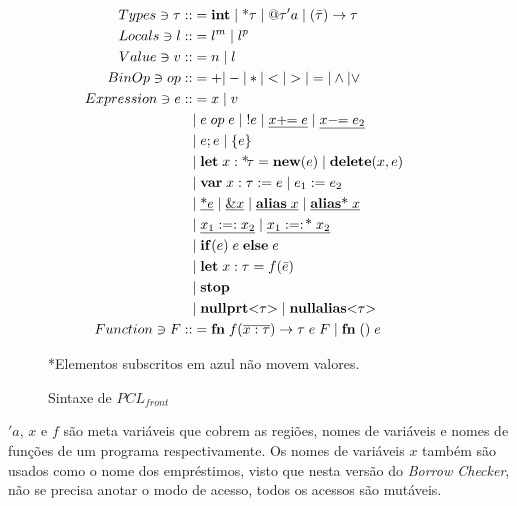 \def\notmov#1{\color{blue}\underline{{\color{black}#1}}\color{black}}

\begin{figure}[ht]
	\caption{Sintaxe de $PCL_{front}$}
	\label{fig:pcl-front:sintax}
	\begin{align*}
		Types \ni \tau ::&= \KW{int} \OR \text{*}\tau \OR @\tau'a \OR (\bar\tau) \to \tau \\
		Locals \ni l ::&= l^m \OR l^p &&\\ 
		Value \ni v ::&= n \OR l && \\
		BinOp \ni op ::&= + | - | * | < | > | = | \land | \lor \\
		Expression \ni e ::&= x \OR v \\
		&\NLOR e\; op\; e \OR !e \OR \notmov{x +\!\!= e} \OR \notmov{x -\!\!= e_2}\\
		&\NLOR e;e \OR \{e\} \\ 
		&\NLOR \KW{let}\;x:\text{*}\!\tau = \KW{new}(e) \OR \KW{delete}(x, e) \; \\ 
		&\NLOR \KW{var}\; x: \tau := e \OR e_1 := e_2 \\
		&\NLOR \notmov{\text{*}e} \OR \notmov{\&x} \OR \notmov{\KW{alias} \; x} \OR \notmov{\KW{alias}\text{*} \; x}\\
		&\NLOR \notmov{x_1 :=: x_2} \OR \notmov{x_1 :=:\!\text{*}\;x_2}\\
		&\NLOR \KW{if}(e) \; e \; \KW{else} \; e\\
		&\NLOR \KW{let}\;x:\tau = f(\bar e) \\ 
		&\NLOR \KW{stop}\\ 
		&\NLOR \KW{nullprt}\typearg{\tau} \OR \KW{nullalias}\typearg{\tau}\\ 
		Function \ni F ::&= \KW{fn} \; f(\overline{x : \tau}) \to \tau \; e \; F \; | \; \KW{fn}\;() \; e \\
	\end{align*}
	\vspace{-4em}
	\begin{flushleft}
		\small
		{\color{red}*}Elementos subscritos em {\color{blue} azul} não movem valores.
	\end{flushleft}
\end{figure}

\noindent$'a$, $x$ e $f$ são meta variáveis que cobrem as regiões, nomes de variáveis e nomes de funções de um programa respectivamente. Os nomes de variáveis $x$ também são usados como o nome dos empréstimos, visto que nesta versão do \emph{Borrow Checker}, não se precisa anotar o modo de acesso, todos os acessos são mutáveis.
 
